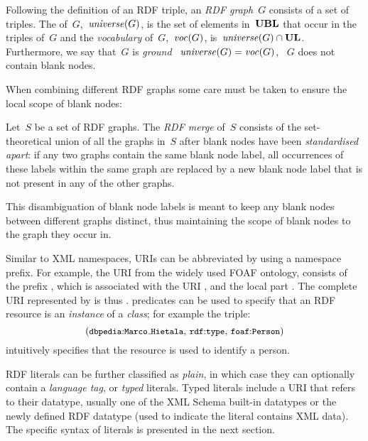 \begin{definition}
  \label{def:rdf-graph}
  Following the definition of an \ac{RDF} triple, an \emph{RDF graph}~$G$ consists of a set of triples.
  The \universe of~$G$,~$\mathit{\mathit{universe}}\!\left(G\right)$, is the set of elements in~$\mathbf{UBL}$ that occur in the triples of~$G$ and the
  \emph{vocabulary} of~$G$,~$\mathit{\mathit{voc}}\!\left(G\right)$, is~$\mathit{\mathit{universe}}\!\left(G\right) \cap \mathbf{UL}$.
  Furthermore, we say that~$G$ is \emph{ground} \iff~$\mathit{\mathit{universe}}\!\left(G\right) = \mathit{\mathit{voc}}\!\left(G\right)$, \ie~$G$ does not contain blank nodes.
\end{definition}

When combining different \ac{RDF} graphs some care must be taken to ensure the local scope of blank nodes:
%
\begin{definition}
  \label{def:rdf-merge}
  Let~$S$ be a set of RDF graphs.  The \emph{RDF merge} of~$S$ consists of the set-theoretical union of all the graphs
  in~$S$ after blank nodes have been \emph{standardised apart}: if any two graphs contain the same blank node label, all
  occurrences of these labels within the same graph are replaced by a new blank node label that is not present in any of
  the other graphs.
\end{definition}
%
\noindent This disambiguation of blank node labels is meant to keep any blank nodes between different graphs distinct, thus
maintaining the scope of blank nodes to the graph they occur in.
%

Similar to \ac{XML} namespaces, \acp{URI} can be abbreviated by using a namespace prefix.
%
For example, the URI  from the widely used \ac{FOAF} ontology, consists of the prefix
, which is associated with the URI , and the
local part .  The complete URI represented by  is thus
.
%
 predicates can be used to specify that an \ac{RDF} resource is an \emph{instance} of a \emph{class};
for example the triple:
%
\begin{equation}
\label{eq:rdf-triple}
\triplee{\qname{dbpedia}{Marco\mathunderscore{}Hietala}}{\qname{rdf}{type}}{\qname{foaf}{Person}}
\end{equation}
% 
intuitively specifies that the resource  is used to identify a person.

\ac{RDF} literals can be further classified as \emph{plain}, in which case they can optionally contain a \emph{language
  tag}, or \emph{typed} literals.
%
Typed literals include a \ac{URI} that refers to their datatype, usually one of the \ac{XML} Schema built-in datatypes
or the newly defined \ac{RDF} datatype  (used to indicate the literal contains \ac{XML} data).
%
The specific syntax of literals is presented in the next section.


